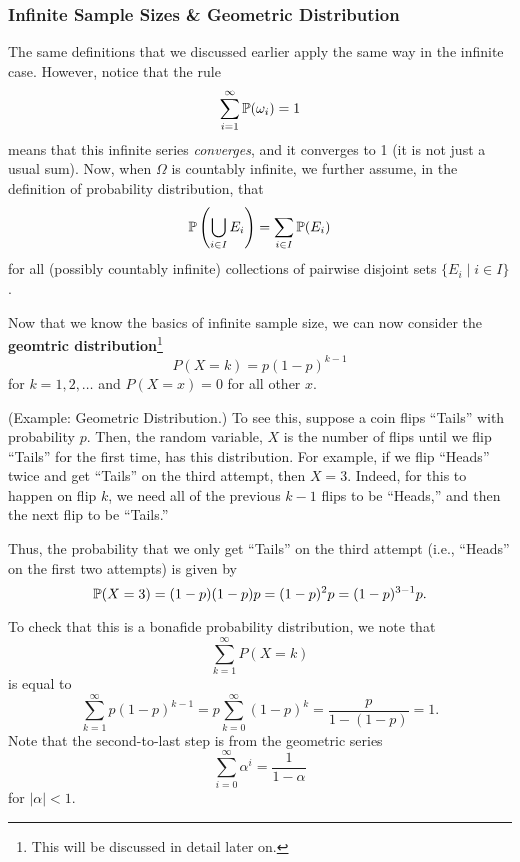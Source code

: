 \subsubsection{Infinite Sample Sizes \& Geometric Distribution}
The same definitions that we discussed earlier apply the same way in the infinite case. However, notice that the rule 
\[\sum_{i = 1}^{\infty} \mathbb{P}(\omega_i) = 1\]
means that this infinite series \emph{converges}, and it converges to 1 (it is not just a usual sum). Now, when $\Omega$ is countably infinite, we further assume, in the definition of probability distribution, that 
\[\mathbb{P}\left(\bigcup_{i \in I} E_i\right) = \sum_{i \in I} \mathbb{P}(E_i)\]
for all (possibly countably infinite) collections of pairwise disjoint sets $\{E_i \mid i \in I\}$.

\bigskip 

Now that we know the basics of infinite sample size, we can now consider the \textbf{geomtric distribution}\footnote{This will be discussed in detail later on.}
    \[P(X = k) = p(1 - p)^{k - 1}\]
for $k = 1, 2, \dots$ and $P(X = x) = 0$ for all other $x$. 
\begin{mdframed}[]
    (Example: Geometric Distribution.) To see this, suppose a coin flips ``Tails'' with probability $p$. Then, the random variable, $X$ is the number of flips until we flip ``Tails'' for the first time, has this distribution. For example, if we flip ``Heads'' twice and get ``Tails'' on the third attempt, then $X = 3$. Indeed, for this to happen on flip $k$, we need all of the previous $k - 1$ flips to be ``Heads,'' and then the next flip to be ``Tails.'' 

    \bigskip 

    Thus, the probability that we only get ``Tails'' on the third attempt (i.e., ``Heads'' on the first two attempts) is given by 
    \[\mathbb{P}(X = 3) = (1 - p) (1 - p) p = (1 - p)^2 p = (1 - p)^{3 - 1} p.\]
\end{mdframed}

To check that this is a bonafide probability distribution, we note that 
\[\sum_{k = 1}^{\infty} P(X = k)\]
is equal to 
\[\sum_{k = 1}^{\infty} p(1 - p)^{k - 1} = p\sum_{k = 0}^{\infty} (1 - p)^k = \frac{p}{1 - (1 - p)} = 1.\]
Note that the second-to-last step is from the geometric series 
\[\sum_{i = 0}^{\infty} \alpha^i = \frac{1}{1 - \alpha}\]
for $|\alpha| < 1$. 
